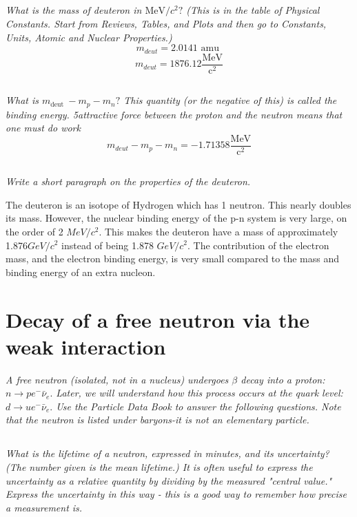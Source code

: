 \documentclass[12pt, letterpaper]{article}
\begin{document}
\subsection{}
\textit{What is the mass of deuteron in $\mathrm{MeV} / c^{2} ?$ (This is in the table of Physical Constants. Start from Reviews, Tables, and Plots and then go to Constants, Units, Atomic and Nuclear Properties.)}
$$
m_{deut}=2.0141 \text { amu }
$$
$$
\boxed{
m_{deut}=1876.12 \frac{\mathrm{MeV}}{\mathrm{c}^{2}}}
$$

\subsection{}
\textit{What is $m_{\text {deut }}-m_{p}-m_{n} ?$ This quantity (or the negative of this) is called the binding energy. 5attractive force between the proton and the neutron means that one must do work}
$$
\boxed{
m_{deut}-m_{p}-m_{n}=-1.71358 \frac{\mathrm{MeV}}{\mathrm{c}^{2}}}
$$

\subsection{}
\textit{Write a short paragraph on the properties of the deuteron.}

The deuteron is an isotope of Hydrogen which has 1 neutron. This nearly doubles its mass. However, the nuclear binding energy of the p-n system is very large, on the order of 2 $MeV/c^2$. This makes the deuteron have a mass of approximately 1.876$ GeV/c^2$ instead of being 1.878 $GeV/c^2$. The contribution of the electron mass, and the electron binding energy, is very small compared to the mass and binding energy of an extra nucleon. 

\section{Decay of a free neutron via the weak interaction}
\textit{A free neutron (isolated, not in a nucleus) undergoes $\beta$ decay into a proton: $n \rightarrow p e^{-} \bar{\nu}_{e} .$ Later, we will understand how this process occurs at the quark level: $d \rightarrow u e^{-} \bar{\nu}_{e} .$ Use the Particle Data Book to answer the following questions. Note that the neutron is listed under baryons-it is not an elementary particle.}

\subsection{}
\textit{What is the lifetime of a neutron, expressed in minutes, and its uncertainty? (The number given is the mean lifetime.) It is often useful to express the uncertainty as a relative quantity by dividing by the measured "central value." Express the uncertainty in this way - this is a good way to remember how precise a measurement is.}
\end{document}
